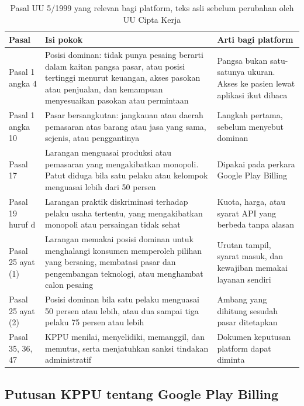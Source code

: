 \begin{table}[!htb]
  \centering
  \caption{Pasal UU 5/1999 yang relevan bagi platform, teks asli sebelum perubahan oleh UU Cipta Kerja}
  \label{tab:ch13-pasal-persaingan}
  \footnotesize
  \begin{tabularx}{\textwidth}{H{2.1cm}GG}
    \hline
    \textbf{Pasal} & \textbf{Isi pokok} & \textbf{Arti bagi platform} \\ \hline
    Pasal 1 angka 4 & Posisi dominan: tidak punya pesaing berarti dalam kaitan pangsa pasar, atau posisi tertinggi menurut keuangan, akses pasokan atau penjualan, dan kemampuan menyesuaikan pasokan atau permintaan & Pangsa bukan satu-satunya ukuran. Akses ke pasien lewat aplikasi ikut dibaca \\ \hline
    Pasal 1 angka 10 & Pasar bersangkutan: jangkauan atau daerah pemasaran atas barang atau jasa yang sama, sejenis, atau penggantinya & Langkah pertama, sebelum menyebut dominan \\ \hline
    Pasal 17 & Larangan menguasai produksi atau pemasaran yang mengakibatkan monopoli. Patut diduga bila satu pelaku atau kelompok menguasai lebih dari 50 persen & Dipakai pada perkara Google Play Billing \\ \hline
    Pasal 19 huruf d & Larangan praktik diskriminasi terhadap pelaku usaha tertentu, yang mengakibatkan monopoli atau persaingan tidak sehat & Kuota, harga, atau syarat API yang berbeda tanpa alasan \\ \hline
    Pasal 25 ayat (1) & Larangan memakai posisi dominan untuk menghalangi konsumen memperoleh pilihan yang bersaing, membatasi pasar dan pengembangan teknologi, atau menghambat calon pesaing & Urutan tampil, syarat masuk, dan kewajiban memakai layanan sendiri \\ \hline
    Pasal 25 ayat (2) & Posisi dominan bila satu pelaku menguasai 50 persen atau lebih, atau dua sampai tiga pelaku 75 persen atau lebih & Ambang yang dihitung sesudah pasar ditetapkan \\ \hline
    Pasal 35, 36, 47 & KPPU menilai, menyelidiki, memanggil, dan memutus, serta menjatuhkan sanksi tindakan administratif & Dokumen keputusan platform dapat diminta \\ \hline
  \end{tabularx}
\end{table}

\subsection{Putusan KPPU tentang Google Play Billing}

